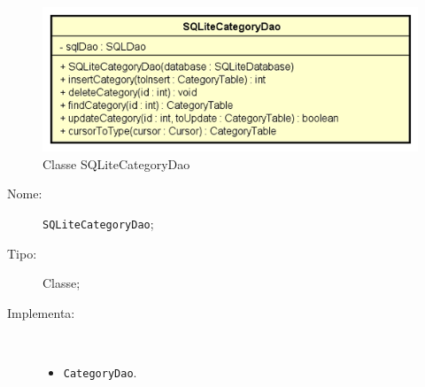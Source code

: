 \documentclass[../DefinizioneDiProdotto.tex]{subfiles}
\begin{document}
    \begin{figure}[H]
        \centering
        \includegraphics{img/SQLiteCategoryDao.png}
        \caption{Classe SQLiteCategoryDao}\label{fig:model::dataaccess::dao::SQLiteCategoryDao} 
    \end{figure}
    \begin{description}
\item[Nome:] \texttt{SQLiteCategoryDao};
\item[Tipo:] Classe;
\item[Implementa:] \
\begin{itemize}
\item \texttt{CategoryDao}.


\end{itemize}
\end{description}
\end{document}
